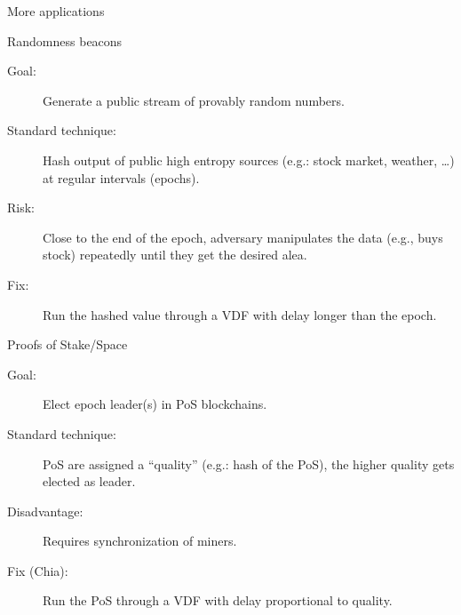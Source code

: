 \documentclass[aspectratio=169]{beamer}
\begin{document}
\begin{frame}{More applications}
  \begin{block}{Randomness beacons}
    \begin{description}
    \item[Goal:] Generate a public stream of provably random numbers.
    \item[Standard technique:] Hash output of public high entropy
      sources (e.g.: stock market, weather, \dots) at regular
      intervals (epochs).
    \item[Risk:] Close to the end of the epoch, adversary manipulates
      the data (e.g., buys stock) repeatedly until they get the
      desired alea.
    \item[Fix:] Run the hashed value through a VDF with delay longer
      than the epoch.
    \end{description}
  \end{block}

  \begin{block}{Proofs of Stake/Space}
    \begin{description}
    \item[Goal:] Elect epoch leader(s) in PoS blockchains.
    \item[Standard technique:] PoS are assigned a ``quality'' (e.g.:
      hash of the PoS), the higher quality gets elected as leader.
    \item[Disadvantage:] Requires synchronization of miners.
    \item[Fix (Chia):] Run the PoS through a VDF with delay
      proportional to quality.
    \end{description}
  \end{block}
\end{frame}

\end{document}
